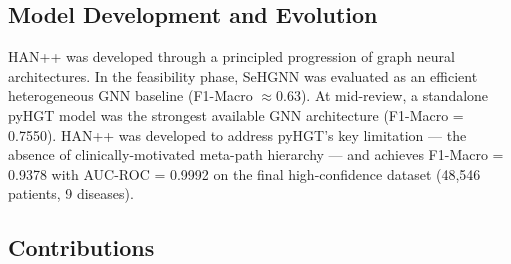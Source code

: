 \documentclass[conference]{IEEEtran}
\begin{document}
\subsection{Model Development and Evolution}
\label{subsec:evolution_intro}

HAN++ was developed through a principled progression of graph neural
architectures.
In the feasibility phase, SeHGNN \cite{yang_2023} was evaluated as an
efficient heterogeneous GNN baseline (F1-Macro $\approx 0.63$).
At mid-review, a standalone pyHGT model \cite{hu_2020} was the strongest
available GNN architecture (F1-Macro = 0.7550).
HAN++ was developed to address pyHGT's key limitation --- the absence of
clinically-motivated meta-path hierarchy --- and achieves
F1-Macro = 0.9378 with AUC-ROC = 0.9992 on the final high-confidence
dataset (48,546 patients, 9 diseases).

\subsection{Contributions}
\label{subsec:contributions}
\end{document}
